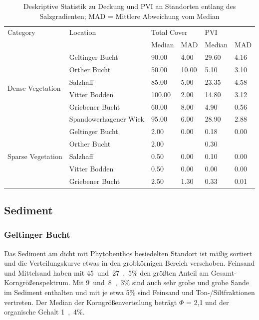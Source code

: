 \begin{table}[!htb]
\centering
\caption[Deskriptive Statistik, Deckung und PVI entlang des Salzgradienten]{Deskriptive Statistik zu Deckung und PVI an Standorten entlang des Salzgradienten; MAD = Mittlere Abweichung vom Median}
\begin{tabular}{llllll}
\toprule
Category & Location 							& \multicolumn{2}{l}{Total Cover} & \multicolumn{2}{l}{PVI}\\
		 &											& Median	& MAD			  & Median	& MAD\\
\midrule
\multirow{6}{*}{Dense Vegetation}& Geltinger Bucht	& 90.00		& 4.00			  & 29.60	& 4.16\\
								 & Orther Bucht		& 50.00		& 10.00			  & 5.10	& 3.10\\
								 & Salzhaff			& 85.00		& 5.00			  & 23.35	& 4.58\\
								 & Vitter Bodden	& 100.00	& 2.00			  & 14.80	& 3.12\\
								 & Griebener Bucht	& 60.00		& 8.00			  & 4.90	& 0.56\\
								 & Spandowerhagener Wiek & 95.00 & 6.00			  & 28.90	& 2.88\\
\midrule
\multirow{5}{*}{Sparse Vegetation}&Geltinger Bucht	& 2.00		& 0.00			  & 0.18	& 0.00\\
								 & Orther Bucht		& 2.00		& 				  & 0.30\\
								 & Salzhaff			& 0.50		& 0.00			  & 0.10	& 0.00\\
								 & Vitter Bodden	& 0.50		& 0.00			  & 0.00	& 0.00\\
								 & Griebener Bucht	& 2.50		& 1.30			  & 0.33	& 0.01\\
\bottomrule
\end{tabular}
\label{tab:statistik_salzgradient_Deckung,PVI}
\end{table}
\FloatBarrier



\subsection{Sediment}

\subsubsection{Geltinger Bucht}

Das Sediment am dicht mit Phytobenthos besiedelten Standort ist mäßig sortiert und die Verteilungskurve etwas in den grobkörnigen Bereich verschoben. Feinsand und Mittelsand haben mit \unit{45 und 27,5}{\%} den größten Anteil am Gesamt-Korngrößenspektrum. Mit \unit{9 und 8,3}{\%} sind auch sehr grobe und grobe Sande im Sediment enthalten und mit je etwa \unit{5}{\%} sind Feinsand und Ton-/Siltfraktionen vertreten. Der Median der Korngrößenverteilung beträgt $ \Phi $ = 2,1 und der organische Gehalt \unit{1,4}{\%}.

